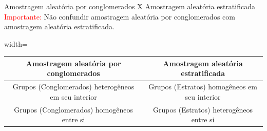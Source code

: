\begin{frame}{Amostragem aleatória por conglomerados X Amostragem aleatória estratificada}
    \textcolor{red}{Importante:} Não confundir amostragem aleatória por conglomerados com amostragem aleatória estratificada.
    \begin{table}[H]
    \centering
    \begin{adjustbox}{width=\textwidth}
    \begin{tabular}{|c|c|}
    \hline
    \textbf{Amostragem aleatória por conglomerados} & \textbf{Amostragem aleatória estratificada} \\\hline
    Grupos (Conglomerados) heterogêneos em seu interior & Grupos (Estratos) homogêneos em seu interior \\ \hline
    Grupos (Conglomerados) homogêneos entre si & Grupos (Estratos) heterogêneos entre si \\ \hline
    \end{tabular}
    \end{adjustbox}
    \end{table}
\end{frame}

